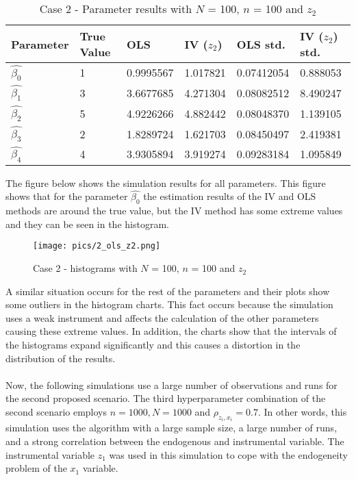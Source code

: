 \documentclass{article}
\begin{document}
\newline
\begin{table}[h!]
\centering
\begin{tabular}{ | m{2cm} | m{2cm}|  m{2cm}| m{2cm}|  m{2cm}| m{2cm}|} 
  \hline
  Parameter & True Value & OLS & IV ($z_{2}$) & OLS std. & IV ($z_{2}$) std.\\ 
  \hline
  $\hat{\beta_{0}}$ & 1 & 0.9995567 & 1.017821 & 0.07412054 & 0.888053\\ 
  \hline
  $\hat{\beta_{1}}$ & 3 & 3.6677685 & 4.271304 & 0.08082512 & 8.490247 \\
  \hline
  $\hat{\beta_{2}}$ & 5 & 4.9226266 & 4.882442 & 0.08048370 & 1.139105 \\
  \hline
  $\hat{\beta_{3}}$ & 2 & 1.8289724 & 1.621703 & 0.08450497 & 2.419381 \\
  \hline
  $\hat{\beta_{4}}$ & 4 & 3.9305894 & 3.919274 & 0.09283184 & 1.095849 \\
  \hline
\end{tabular}
\caption{Case 2 - Parameter results with $N$ = 100, $n$ = 100 and $z_{2}$}
\label{table:7}
\end{table}
\newline
The figure below shows the simulation results for all parameters. This figure shows that for the parameter $\hat{\beta_{0}}$ the estimation results of the IV and OLS methods are around the true value, but the IV method has some extreme values and they can be seen in the histogram. 
\newline
\begin{figure}[h]
\centering
\texttt{[image: pics/2\_ols\_z2.png]}
\caption{Case 2 - histograms with $N$ = 100, $n$ = 100 and $z_{2}$}
\label{fig:image2}
\end{figure}
\newline
A similar situation occurs for the rest of the parameters and their plots show some outliers in the histogram charts. This fact occurs because the simulation uses a weak instrument and affects the calculation of the other parameters causing these extreme values. In addition, the charts show that the intervals of the histograms expand significantly and this causes a distortion in the distribution of the results.
\\~\\
Now, the following simulations use a large number of observations and runs for the second proposed scenario. The third hyperparameter combination of the second scenario employs $n = 1000, N = 1000$ and $\rho_{z_{i},x_{i}} = 0.7$. In other words, this simulation uses the algorithm with a large sample size, a large number of runs, and a strong correlation between the endogenous and instrumental variable. The instrumental variable $z_{1}$ was used in this simulation to cope with the endogeneity problem of the $x_{1}$ variable.
\end{document}
